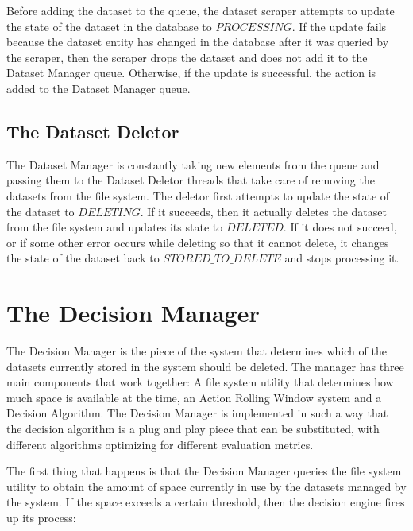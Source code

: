 Before adding the dataset to the queue, the dataset scraper attempts to update the state of the dataset in the database to $PROCESSING$. If the update fails because the dataset entity has changed in the database after it was queried by the scraper, then the scraper drops the dataset and does not add it to the Dataset Manager queue. Otherwise, if the update is successful, the action is added to the Dataset Manager queue.

\subsection{The Dataset Deletor}
The Dataset Manager is constantly taking new elements from the queue and passing them to the Dataset Deletor threads that take care of removing the datasets from the file system. The deletor first attempts to update the state of the dataset to $DELETING$. If it succeeds, then it actually deletes the dataset from the file system and updates its state to $DELETED$. If it does not succeed, or if some other error occurs while deleting so that it cannot delete, it changes the state of the dataset back to $STORED\_TO\_DELETE$ and stops processing it.

\section{The Decision Manager}
The Decision Manager is the piece of the system that determines which of the datasets currently stored in the system should be deleted. The manager has three main components that work together: A file system utility that determines how much space is available at the time, an Action Rolling Window system and a Decision Algorithm. The Decision Manager is implemented in such a way that the decision algorithm is a plug and play piece that can be substituted, with different algorithms optimizing for different evaluation metrics.

The first thing that happens is that the Decision Manager queries the file system utility to obtain the amount of space currently in use by the datasets managed by the system. If the space exceeds a certain threshold, then the decision engine fires up its process:

